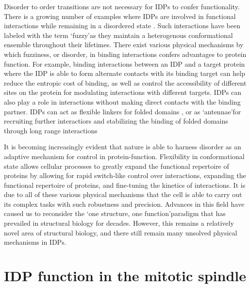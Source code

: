 \par Disorder to order transitions are not necessary for IDPs to confer functionality. There is a growing number of examples where IDPs are involved in functional interactions while remaining in a disordered state \cite{tompa2008fuzzy}. Such interactions have been labeled with the term \lq fuzzy\rq as they maintain a heterogenous conformational ensemble throughout their lifetimes. There exist various physical mechanisms by which fuzziness, or disorder, in binding interactions confers advantages to protein function. For example, binding interactions between an IDP and a target protein where the IDP is able to form alternate contacts with its binding target can help reduce the entropic cost of binding, as well as control the accessibility of different sites on the protein for modulating interactions with different targets. \cite{graham2001tcf4, fontes2000structural} IDPs can also play a role in interactions without making direct contacts with the binding partner.  IDPs can act as flexible linkers for folded domains \cite{bhattacharyya2006ste5}, or as \lq antennae\rq for \cite{sigalov2004homooligomerization} recruiting further interactiors and stabilizing the binding of folded domains through long range interactions \cite{zor2002roles, yu1994structural} 

It is becoming increasingly evident that nature is able to harness disorder as an adaptive mechanism for control in protein-function. Flexibility in conformational state allows cellular processes to greatly expand the functional repertoire of proteins by allowing for rapid switch-like control over interactions, expanding the functional repertoire of proteins, and fine-tuning the kinetics of interactions.  It is due to all of these various physical mechanisms that the cell is able to carry out its complex tasks with such robustness and precision. Advances in this field have caused us to reconsider the  \lq one structure, one function\rq paradigm that has prevailed in structural biology for decades. However, this remains a relatively novel area of structural biology, and there still remain many unsolved physical mechanisms in IDPs.

\section{IDP function in the mitotic spindle}
 
